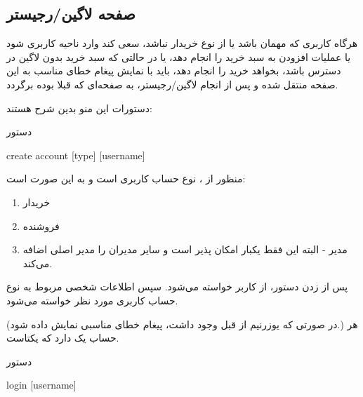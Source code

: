 \documentclass[]{article}
\begin{document}
\newpage


\subsection*{{\titr صفحه لاگین/رجیستر}}

هرگاه کاربری که مهمان باشد یا از نوع خریدار نباشد، سعی کند وارد ناحیه کاربری شود یا عملیات افزودن به سبد خرید را انجام دهد، یا در حالتی که سبد خرید بدون لاگین در دسترس باشد، بخواهد خرید را انجام دهد، باید با نمایش پیغام خطای مناسب به این صفحه منتقل شده و پس از انجام لاگین/رجیستر، به صفحه‌ای که قبلا بوده برگردد.

دستورات این منو بدین شرح هستند:


\begin{mybox}[colback=yellow]{دستور}


\begin{latin}

create account [type] [username]

\end{latin}

\end{mybox}

منظور از ، نوع حساب کاربری است و به این صورت است:

\begin{enumerate}

\item
 خریدار
 
 \item
 فروشنده
 
 \item
 مدیر - البته این فقط یکبار امکان پذیر است و سایر مدیران را مدیر اصلی اضافه می‌کند.
 
 \end{enumerate}
 
پس از زدن دستور، از کاربر  خواسته می‌شود. سپس اطلاعات شخصی مربوط به نوع حساب کاربری مورد نظر خواسته‌ می‌شود.

(در صورتی که یوزرنیم از قبل وجود داشت، پیغام خطای مناسبی نمایش داده شود.)
هر حساب یک  دارد که یکتاست.

\hrulefill

\begin{mybox}[colback=yellow]{دستور}


\begin{latin}

login [username]

\end{latin}

\end{mybox}
\end{document}
